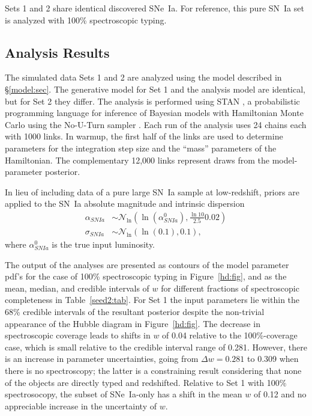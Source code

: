 \documentclass[preprint,3p]{elsarticle}
\begin{document}
Sets 1 and 2 share identical discovered SNe~Ia.  For reference, this pure SN~Ia
set is analyzed with 100\% spectroscopic typing. 


\subsection{Analysis Results}
The simulated data Sets 1 and 2 are analyzed using the model described
in \S\ref{model:sec}.  The generative model for Set 1 and the analysis model are 
identical, but for Set 2 they differ.
The analysis is performed using STAN 
\citep{stan-software:2015},
a probabilistic programming language for
inference of Bayesian models with Hamiltonian Monte Carlo
using the No-U-Turn sampler \citep{Homan:2014:NSA:2627435.2638586}.  Each run of the analysis
uses 24 chains each with 1000 links.  In warmup, the first half of the links are used to
determine parameters for the integration step size and the ``mass''
parameters of the Hamiltonian. The complementary
12,000 links represent draws from the model-parameter posterior.

In lieu of including data of
a pure large SN~Ia sample at low-redshift,
priors are applied to the SN~Ia absolute magnitude and intrinsic dispersion
\begin{align}
\alpha_{SNIa} & \sim \mathcal{N}_{\ln}\left(\ln\left(\alpha^0_{SNIa}\right),\frac{\ln{10}}{2.5}0.02\right)\\
\sigma_{SNIa} & \sim \mathcal{N}_{\ln}\left(\ln\left(0.1\right),0.1\right),
\end{align}
where $\alpha^0_{SNIa}$ is the true input luminosity.

The output of the analyses are presented as contours of the model
parameter pdf's for the case of 100\% spectroscopic
typing in Figure~\ref{hd:fig}, and as the mean, median, and
credible intervals of $w$ for different fractions of
spectroscopic completeness in Table~\ref{seed2:tab}.
For Set 1  the input parameters lie 
within the 68\% credible intervals of the resultant posterior despite the non-trivial appearance of
the Hubble diagram in Figure~\ref{hd:fig}.
The decrease in spectroscopic coverage leads to shifts in $w$ of 0.04 relative to the 100\%-coverage case, which is small
relative to the credible interval range of 0.281.  However, there is an
increase in parameter uncertainties, going from $\Delta w= 0.281$ to 0.309
when there is no spectroscopy; the latter is a constraining result considering that none of the
objects are directly typed and redshifted.
Relative to Set 1 with 100\% spectrosocopy,
the subset of SNe~Ia-only has a shift in the mean $w$ of 0.12
and no appreciable increase in the uncertainty of $w$.
\end{document}

